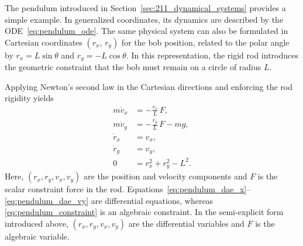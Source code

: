 The pendulum introduced in Section~\ref{sec:211_dynamical_systems} provides a simple example.
In generalized coordinates, its dynamics are described by the \ac{ODE}~\eqref{eq:pendulum_ode}.
The same physical system can also be formulated in Cartesian coordinates $(r_x,\,r_y)$ for the bob position, related to the polar angle by $r_x = L\sin\theta$ and $r_y = -L\cos\theta$.
In this representation, the rigid rod introduces the geometric constraint that the bob must remain on a circle of radius $L$.

Applying Newton's second law in the Cartesian directions and enforcing the rod rigidity yields \cite{Modelica_Fritzson}
\begin{align}
    m\dot{v}_x &= -\frac{r_x}{L}\,F,              \label{eq:pendulum_dae_x}\\
    m\dot{v}_y &= -\frac{r_y}{L}\,F - mg,         \label{eq:pendulum_dae_y}\\
    \dot{r}_x  &= v_x,                            \label{eq:pendulum_dae_vx}\\
    \dot{r}_y  &= v_y,                            \label{eq:pendulum_dae_vy}\\
    0          &= r_x^2 + r_y^2 - L^2.           \label{eq:pendulum_constraint}
\end{align}
Here, $(r_x,r_y,v_x,v_y)$ are the position and velocity components and $F$ is the scalar constraint force in the rod.
Equations~\eqref{eq:pendulum_dae_x}--\eqref{eq:pendulum_dae_vy} are differential equations, whereas \eqref{eq:pendulum_constraint} is an algebraic constraint.
In the semi-explicit form introduced above, $(r_x,r_y,v_x,v_y)$ are the differential variables and $F$ is the algebraic variable.

